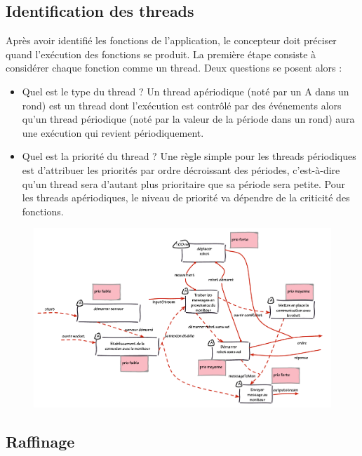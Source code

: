 \documentclass[11pt,a4paper]{paper}
\begin{document}
\subsection{Identification des threads}
Après avoir identifié les fonctions de l'application, le concepteur doit préciser quand l'exécution des fonctions se produit. La première étape consiste à considérer chaque fonction comme un thread. Deux questions se posent alors :
\begin{itemize}
	\item Quel est le type du thread ? Un thread apériodique (noté par un A dans un rond) est un thread dont l'exécution est contrôlé par des événements alors qu'un thread périodique (noté par la valeur de la période dans un rond) aura une exécution qui revient périodiquement.
	\item Quel est la priorité du thread ? Une règle simple pour les threads périodiques est d'attribuer les priorités par ordre décroissant des périodes, c'est-à-dire qu'un thread sera d'autant plus prioritaire que sa période sera petite.  Pour les threads apériodiques, le niveau de priorité va dépendre de la criticité des fonctions.\\
\end{itemize}

 \begin{figure}[htbp]
\begin{center}
\includegraphics[scale=0.5]{figures_pdf/fonc/thread}
\end{center}
\end{figure}
\FloatBarrier

\subsection{Raffinage}
\end{document}
